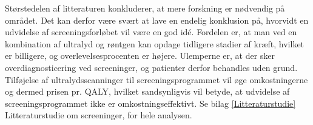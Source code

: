Størstedelen af litteraturen konkluderer, at mere forskning er nødvendig på området. Det kan derfor være svært at lave en endelig konklusion på, hvorvidt en udvidelse af screeningsforløbet vil være en god idé. Fordelen er, at man ved en kombination af ultralyd og røntgen kan opdage tidligere stadier af kræft, hvilket er billigere, og overlevelsesprocenten er højere. Ulemperne er, at der sker overdiagnosticering ved screeninger, og patienter derfor behandles uden grund. Tilføjelse af ultralydsscanninger til screeningsprogrammet vil øge omkostningerne og dermed prisen pr. QALY, hvilket sandsynligvis vil betyde, at udvidelse af screeningsprogrammet ikke er omkostningseffektivt. Se bilag \ref{Litteraturstudie} Litteraturstudie om screeninger, for hele analysen. 
